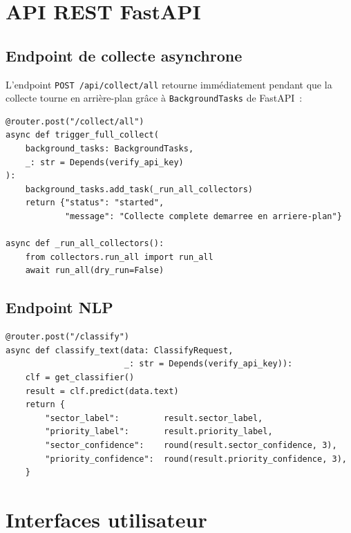 \section{API REST FastAPI}

\subsection{Endpoint de collecte asynchrone}

L'endpoint \texttt{POST /api/collect/all} retourne immédiatement pendant que
la collecte tourne en arrière-plan grâce à \texttt{BackgroundTasks} de FastAPI~:

\begin{lstlisting}[language=Python3, caption={Collecte déclenchée en BackgroundTask}, label=lst:collect_api]
@router.post("/collect/all")
async def trigger_full_collect(
    background_tasks: BackgroundTasks,
    _: str = Depends(verify_api_key)
):
    background_tasks.add_task(_run_all_collectors)
    return {"status": "started",
            "message": "Collecte complete demarree en arriere-plan"}

async def _run_all_collectors():
    from collectors.run_all import run_all
    await run_all(dry_run=False)
\end{lstlisting}

\subsection{Endpoint NLP}

\begin{lstlisting}[language=Python3, caption={Classification NLP via API}, label=lst:nlp_api]
@router.post("/classify")
async def classify_text(data: ClassifyRequest,
                        _: str = Depends(verify_api_key)):
    clf = get_classifier()
    result = clf.predict(data.text)
    return {
        "sector_label":         result.sector_label,
        "priority_label":       result.priority_label,
        "sector_confidence":    round(result.sector_confidence, 3),
        "priority_confidence":  round(result.priority_confidence, 3),
    }
\end{lstlisting}

\section{Interfaces utilisateur}

